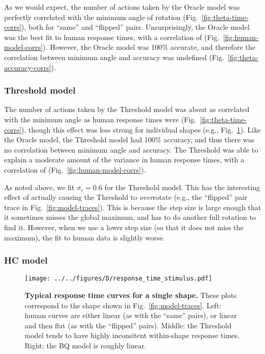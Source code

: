 \documentclass[10pt,letterpaper]{article}
\newcommand{\Oc}[0]{Oracle}
\newcommand{\Th}[0]{Threshold}
\newcommand{\Hc}[0]{HC}
\newcommand{\Bq}[0]{BQ}
\begin{document}
As we would expect, the number of actions taken by the \Oc{} model was
perfectly correlated with the minimum angle of rotation
(Fig.~\ref{fig:theta-time-corrs}), both for ``same'' and ``flipped''
pairs. Unsurprisingly, the \Oc{} model was the best fit to human
response times, with a correlation of \OcTimeCorr{}
(Fig.~\ref{fig:human-model-corrs}).  However, the \Oc{} model was
100\% accurate, and therefore the correlation between minimum angle
and accuracy was undefined (Fig.~\ref{fig:theta-accuracy-corrs}).

\subsubsection{\Th{} model}

The number of actions taken by the \Th{} model was about as correlated
with the minimum angle as human response times were
(Fig.~\ref{fig:theta-time-corrs}), though this effect was less strong
for individual shapes (e.g.,
Fig.~\ref{fig:response-time-stimulus}). Like the \Oc{} model, the
\Th{} model had 100\% accuracy, and thus there was no correlation
between minimum angle and accuracy. The \Th{} was able to explain a
moderate amount of the variance in human response times, with a
correlation of \ThTimeCorr{} (Fig.~\ref{fig:human-model-corrs}).

As noted above, we fit $\sigma_\epsilon=0.6$ for the \Th{} model. This
has the interesting effect of actually causing the \Th{} to
\textit{over}rotate (e.g., the ``flipped'' pair trace in
Fig.~\ref{fig:model-traces}). This is because the step size is large
enough that it sometimes misses the global maximum, and has to do
another full rotation to find it. However, when we use a lower step
size (so that it does not miss the maximum), the fit to human data is
slightly worse.

\subsubsection{\Hc{} model}

\begin{figure}[t]
  \begin{center}
    \texttt{[image: ../../figures/D/response\_time\_stimulus.pdf]}
    \caption{\textbf{Typical response time curves for a single shape.}
      These plots correspond to the shape shown in
      Fig.~\ref{fig:model-traces}. Left: human curves are either
      linear (as with the ``same'' pairs), or linear and then flat (as
      with the ``flipped'' pairs). Middle: the \Th{} model tends to
      have highly inconsitent within-shape response times. Right: the
      \Bq{} model is roughly linear.}
    \label{fig:response-time-stimulus}
  \end{center}
\end{figure}
\end{document}
